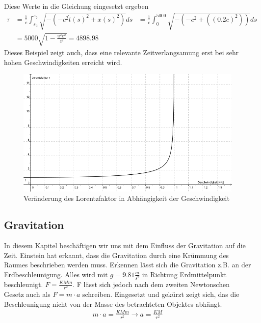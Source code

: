\begin{refsection}
\begin{align*}
\end{align*}
Diese Werte in die Gleichung eingesetzt ergeben
\begin{align*}
    \tau
    &=
    \frac{1}{c}\int_{s_{a}}^{s_{b}}\sqrt{-(-c^2\dot{t}(s)^2+\dot{x}(s)^2)}ds
    &=
    \frac{1}{c}\int_{0}^{5000}\sqrt{-(-c^2+((0.2c)^2))}ds\\
    &=
    5000\sqrt{1-\frac{u^2 c^2}{c^2}} = 4898.98
\end{align*}
Dieses Beispiel zeigt auch, dass eine relevante Zeitverlangsamung erst bei sehr hohen Geschwindigkeiten erreicht wird.
\begin{figure}[H]
    \centering
    \includegraphics[width=\hsize]{zeitreisen/Lorentzfaktor.jpg}
    \caption{Ver\"anderung des Lorentzfaktor in Abh\"angigkeit der Geschwindigkeit%
        \label{skript:geodaten:fig:transport}}
\end{figure}
\subsection{Gravitation}

	In diesem Kapitel beschäftigen wir uns mit dem Einfluss der Gravitation auf die Zeit. Einstein hat erkannt, dass die Gravitation durch eine Krümmung des Raumes beschrieben werden muss. Erkennen lässt sich die Gravitation z.B. an der Erdbeschleunigung. Alles wird mit $g=9.81\frac{m}{s^2}$ in Richtung Erdmittelpunkt beschleunigt. $F=\frac{KMm}{r^2}$. F lässt sich jedoch nach dem zweiten Newtonschen Gesetz auch als $F=m\cdot a$ schreiben. Eingesetzt und gekürzt zeigt sich, das die Beschleunigung nicht von der Masse des betrachteten Objektes abhängt.
	\begin{align*}
		m\cdot a = \frac{KMm}{r^2} \rightarrow a=\frac{KM}{r^2} 
	\end{align*}
	

\end{refsection}
